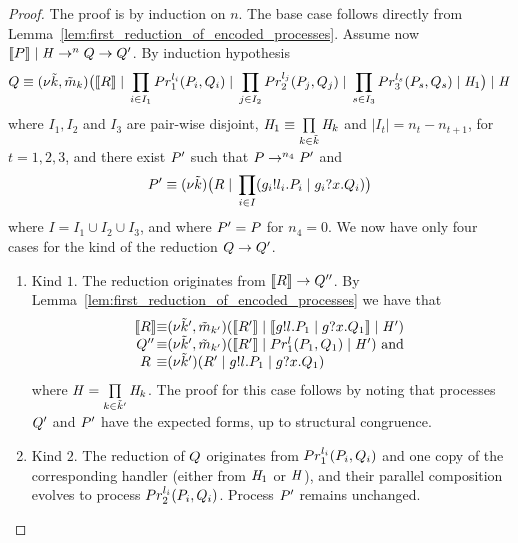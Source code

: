 \begin{proof}
The proof is by induction on $n$. The base case follows directly from Lemma~\ref{lem:first_reduction_of_encoded_processes}. Assume now $\llbracket P \rrbracket \;|\; \mathit{H} \rightarrow^n Q\rightarrow Q'$. By induction hypothesis
\[
Q\equiv (\nu \tilde{k},\tilde{m}_k)\big( \llbracket R \rrbracket \;|\; \prod\limits_{i\in I_1} Pr_1^{l_i}(P_i, Q_i) \;|\; \prod_{j\in I_2} Pr_2^{l_j}(P_j, Q_j) \;|\; \prod_{s\in I_3} Pr_3^{l_s}(P_s, Q_s) \;|\; \mathit{H}_1\big)\;|\; \mathit{H}
\]
where $I_1, I_2$ and $I_3$ are pair-wise disjoint, $\mathit{H}_1\equiv \prod\limits_{k\in\tilde{k}} \mathit{H}_k$ and $|I_t|=n_t-n_{t+1}$, for $t=1,2,3$, and there exist $P'$ such that $P\rightarrow^{n_4}P'$ and 
\[
P' \equiv (\nu \tilde{k})\big(R \;|\; \prod\limits_{i \in I} (g_i!l_i.P_i  \;|\; g_i?x.Q_i)\big)
\]
where $I=I_1\cup I_2\cup I_3$, and where $P'=P$ for $n_4=0$.
We now have only four cases for the kind of the reduction $Q\rightarrow Q'$.
\begin{enumerate}
\item Kind $1$. The reduction originates from $\llbracket R \rrbracket\rightarrow Q''$. By Lemma~\ref{lem:first_reduction_of_encoded_processes} we have that
\[
\begin{array}{@{}c@{}c@{}l@{}}
\enc{\PR} & \equiv & \rest{\tilde{\NK}', \tilde{\NM}_{\NK'}}(\enc{\PR'} \parop \enc{\send\NGG\role\msg\NL.\PP_1\parop \receive\NGG\role\msg\NX.\PQ_1} \parop  \handler')\\
\PQ'' & \equiv & \rest{\tilde{\NK}', \tilde{\NM}_{\NK'}}(\enc{\PR'} \parop \Proc_1^\NL(\PP_1,\PQ_1) \parop  \handler')  \text{ and }\\
\PR & \equiv & \rest{\tilde{\NK}'}(\PR' \parop \send\NGG\role\msg\NL.\PP_1\parop \receive\NGG\role\msg\NX.\PQ_1 ) \\
\end{array}
 \]
where $\mathit{H}=\prod\limits_{k\in\tilde{k}'}\mathit{H}_k$. 
The proof for this case follows by noting that processes $Q'$ and $P'$ have the expected forms, up to structural congruence. %
%
\item Kind $2$. The reduction of $Q$ originates from $Pr_1^{l_i}(P_i, Q_i)$ and one copy of the corresponding handler (either from $\mathit{H}_1$ or $\mathit{H}$), and their parallel composition evolves to process $Pr_2^{l_i}(P_i, Q_i)$. Process $P'$ remains unchanged.

\end{enumerate}
\end{proof}
